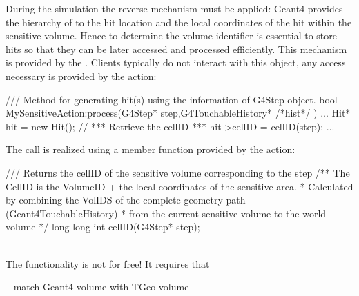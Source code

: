\noindent 
During the simulation the reverse mechanism must be applied: Geant4 provides
the hierarchy of  to the hit location and the local coordinates
of the hit within the sensitive volume. Hence to determine the volume identifier
is essential to store hits so that they can be later accessed and processed efficiently.
This mechanism is provided by the . Clients typically do not
interact with this object, any access necessary is provided by the
 action:
\begin{unnumberedcode}
  /// Method for generating hit(s) using the information of G4Step object.
  bool MySensitiveAction:process(G4Step* step,G4TouchableHistory* /*hist*/ ) {
    ...
    Hit* hit = new Hit();
    // *** Retrieve the cellID  ***
    hit->cellID = cellID(step);
    ...
  }
\end{unnumberedcode}
The call is realized using a member function provided by the 
 action:
\begin{unnumberedcode}
  /// Returns the cellID of the sensitive volume corresponding to the step
  /** The CellID is the VolumeID + the local coordinates of the sensitive area.
   *  Calculated by combining the VolIDS of the complete geometry path (Geant4TouchableHistory)
   *  from the current sensitive volume to the world volume
   */
  long long int cellID(G4Step* step);
\end{unnumberedcode}

\noindent
{}\\
The  functionality is not for free! It requires that


\noindent
-- match Geant4 volume with TGeo volume


